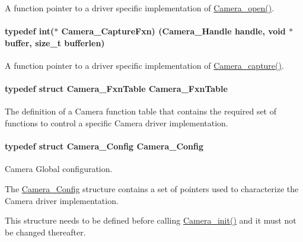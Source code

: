 A function pointer to a driver specific implementation of \hyperlink{_camera_8h_a5bd1f515c97e0f598ff554c663bc6cde}{Camera\+\_\+open()}. 

\paragraph[{Camera\+\_\+\+Capture\+Fxn}]{\setlength{\rightskip}{0pt plus 5cm}typedef int($\ast$ Camera\+\_\+\+Capture\+Fxn) ({\bf Camera\+\_\+\+Handle} handle, void $\ast$buffer, size\+\_\+t bufferlen)}\label{_camera_8h_a2096274266d6a07b48ee25d8f43805a0}


A function pointer to a driver specific implementation of \hyperlink{_camera_8h_a972bd90e219313d8eca55626c4294c8e}{Camera\+\_\+capture()}. 

\paragraph[{Camera\+\_\+\+Fxn\+Table}]{\setlength{\rightskip}{0pt plus 5cm}typedef struct {\bf Camera\+\_\+\+Fxn\+Table}  {\bf Camera\+\_\+\+Fxn\+Table}}\label{_camera_8h_a8c1bd8d1a6d98633dc28a657733d56c8}


The definition of a Camera function table that contains the required set of functions to control a specific Camera driver implementation. 

\paragraph[{Camera\+\_\+\+Config}]{\setlength{\rightskip}{0pt plus 5cm}typedef struct {\bf Camera\+\_\+\+Config}  {\bf Camera\+\_\+\+Config}}\label{_camera_8h_a5dc443a0790d8bd9762dff8cc0716ca0}


Camera Global configuration. 

The \hyperlink{struct_camera___config}{Camera\+\_\+\+Config} structure contains a set of pointers used to characterize the Camera driver implementation.

This structure needs to be defined before calling \hyperlink{_camera_8h_ab0208c74b70ac5b50cb26c36f1f3ebad}{Camera\+\_\+init()} and it must not be changed thereafter.

